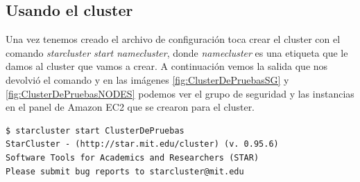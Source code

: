 \documentclass{article}
\begin{document}
\subsection{Usando el cluster}
	Una vez tenemos creado el archivo de configuración toca crear el cluster con el comando \emph{starcluster start namecluster}, donde \emph{namecluster} es una etiqueta que le damos al cluster que vamos a crear. A continuación vemos la salida que nos devolvió el comando y en las imágenes \ref{fig:ClusterDePruebasSG} y \ref{fig:ClusterDePruebasNODES} podemos ver el grupo de seguridad y las instancias en el panel de Amazon EC2 que se crearon para el cluster.
\begin{lstlisting}[style=miniBash]
$ starcluster start ClusterDePruebas
StarCluster - (http://star.mit.edu/cluster) (v. 0.95.6)
Software Tools for Academics and Researchers (STAR)
Please submit bug reports to starcluster@mit.edu


\end{lstlisting}
\end{document}
